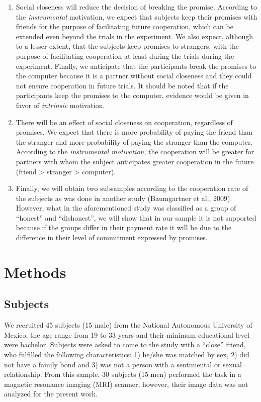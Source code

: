 \documentclass[12pt,]{article}
\begin{document}
\begin{enumerate}
\def\labelenumi{\arabic{enumi}.}
\item
  Social closeness will reduce the decision of breaking the promise.
  According to the \emph{instrumental} motivation, we expect that
  subjects keep their promises with friends for the purpose of
  facilitating future cooperation, which can be extended even beyond the
  trials in the experiment. We also expect, although to a lesser extent,
  that the subjects keep promises to strangers, with the purpose of
  facilitating cooperation at least during the trials during the
  experiment. Finally, we anticipate that the participants break the
  promises to the computer because it is a partner without social
  closeness and they could not ensure cooperation in future trials. It
  should be noted that if the participants keep the promises to the
  computer, evidence would be given in favor of \emph{intrinsic}
  motivation.
\item
  There will be an effect of social closeness on cooperation, regardless
  of promises. We expect that there is more probability of paying the
  friend than the stranger and more probability of paying the stranger
  than the computer. According to the \emph{instrumental motivation},
  the cooperation will be greater for partners with whom the subject
  anticipates greater cooperation in the future (friend \textgreater{}
  stranger \textgreater{} computer).
\item
  Finally, we will obtain two subsamples according to the cooperation
  rate of the subjects as was done in another study (Baumgartner et al.,
  2009). However, what in the aforementioned study was classified as a
  group of ``honest'' and ``dishonest'', we will show that in our sample
  it is not supported because if the groups differ in their payment rate
  it will be due to the difference in their level of commitment
  expressed by promises.
\end{enumerate}

\hypertarget{methods}{%
\section{Methods}\label{methods}}

\hypertarget{subjects}{%
\subsection{Subjects}\label{subjects}}

We recruited 45 subjects (15 male) from the National Autonomous
University of Mexico, the age range from 19 to 33 years and their
minimum educational level were bachelor. Subjects were asked to come to
the study with a ``close'' friend, who fulfilled the following
characteristics: 1) he/she was matched by sex, 2) did not have a family
bond and 3) was not a person with a sentimental or sexual relationship.
From this sample, 30 subjects (15 men) performed the task in a magnetic
resonance imaging (MRI) scanner, however, their image data was not
analyzed for the present work.
\end{document}
